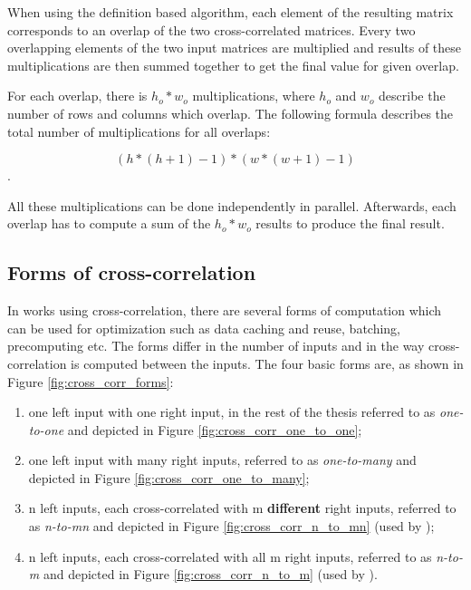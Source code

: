 When using the definition based algorithm, each element of the resulting matrix corresponds to an overlap of the two cross-correlated matrices. Every two overlapping elements of the two input matrices are multiplied and results of these multiplications are then summed together to get the final value for given overlap.

For each overlap, there is $h_o * w_o$ multiplications, where $h_o$ and $w_o$ describe the number of rows and columns which overlap. The following formula describes the total number of multiplications for all overlaps:

\[
	(h*(h+1)-1)*(w*(w+1)-1)
\].

All these multiplications can be done independently in parallel. Afterwards, each overlap has to compute a sum of the $h_o * w_o$ results to produce the final result.



\subsection{Forms of cross-correlation}
\label{sec:cross_corr_forms}

In works using cross-correlation, there are several forms of computation which can be used for optimization such as data caching and reuse, batching, precomputing etc. The forms differ in the number of inputs and in the way cross-correlation is computed between the inputs. 
The four basic forms are, as shown in Figure \ref{fig:cross_corr_forms}:

\begin{enumerate}
	\item one left input with one right input, in the rest of the thesis referred to as \textit{one-to-one} and depicted in Figure \ref{fig:cross_corr_one_to_one};
	\item one left input with many right inputs, referred to as \textit{one-to-many} and depicted in Figure \ref{fig:cross_corr_one_to_many};
	\item n left inputs, each cross-correlated with m \textbf{different} right inputs, referred to as \textit{n-to-mn} and depicted in Figure \ref{fig:cross_corr_n_to_mn} (used by \citet{misko} \citet{zhang2015} \citet{Kapinchev2015});
	\item n left inputs, each cross-correlated with all m right inputs, referred to as \textit{n-to-m} and depicted in Figure \ref{fig:cross_corr_n_to_m} (used by \citet{Clark2011}).
\end{enumerate} 

